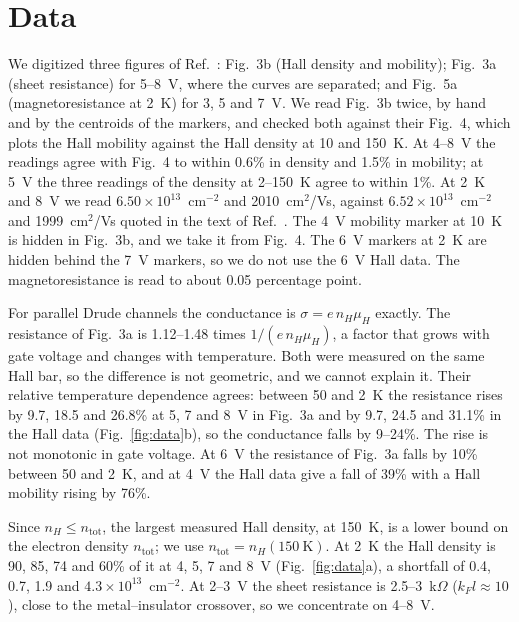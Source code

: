\documentclass[11pt]{article}
\newcommand{\ntot}{n_\mathrm{tot}}
\begin{document}
\section{Data}\label{sec:data}
We digitized three figures of Ref.~\cite{Lee2024LIO}: Fig.~3b (Hall density and mobility); Fig.~3a (sheet resistance) for 5--8~V, where the curves are separated; and Fig.~5a (magnetoresistance at 2~K) for 3, 5 and 7~V. We read Fig.~3b twice, by hand and by the centroids of the markers, and checked both against their Fig.~4, which plots the Hall mobility against the Hall density at 10 and 150~K. At 4--8~V the readings agree with Fig.~4 to within 0.6\% in density and 1.5\% in mobility; at 5~V the three readings of the density at 2--150~K agree to within 1\%. At 2~K and 8~V we read $6.50\times10^{13}$~cm$^{-2}$ and 2010~cm$^2$/Vs, against $6.52\times10^{13}$~cm$^{-2}$ and 1999~cm$^2$/Vs quoted in the text of Ref.~\cite{Lee2024LIO}. The 4~V mobility marker at 10~K is hidden in Fig.~3b, and we take it from Fig.~4. The 6~V markers at 2~K are hidden behind the 7~V markers, so we do not use the 6~V Hall data. The magnetoresistance is read to about 0.05 percentage point.

For parallel Drude channels the conductance is $\sigma=e\,n_H\mu_H$ exactly. The resistance of Fig.~3a is 1.12--1.48 times $1/(e\,n_H\mu_H)$, a factor that grows with gate voltage and changes with temperature. Both were measured on the same Hall bar, so the difference is not geometric, and we cannot explain it. Their relative temperature dependence agrees: between 50 and 2~K the resistance rises by 9.7, 18.5 and 26.8\% at 5, 7 and 8~V in Fig.~3a and by 9.7, 24.5 and 31.1\% in the Hall data (Fig.~\ref{fig:data}b), so the conductance falls by 9--24\%. The rise is not monotonic in gate voltage. At 6~V the resistance of Fig.~3a falls by 10\% between 50 and 2~K, and at 4~V the Hall data give a fall of 39\% with a Hall mobility rising by 76\%.

Since $n_H\le\ntot$, the largest measured Hall density, at 150~K, is a lower bound on the electron density $\ntot$; we use $\ntot=n_H(150\ \mathrm{K})$. At 2~K the Hall density is 90, 85, 74 and 60\% of it at 4, 5, 7 and 8~V (Fig.~\ref{fig:data}a), a shortfall of 0.4, 0.7, 1.9 and $4.3\times10^{13}$~cm$^{-2}$. At 2--3~V the sheet resistance is 2.5--3~k$\Omega$ ($k_Fl\approx10$), close to the metal--insulator crossover, so we concentrate on 4--8~V.
\end{document}
